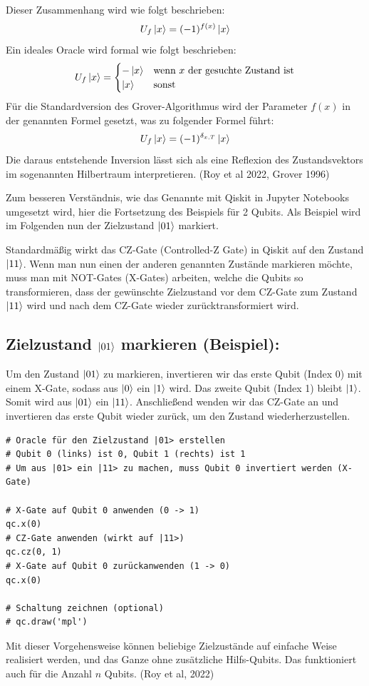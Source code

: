 Dieser Zusammenhang wird wie folgt beschrieben:
$$
U_f \ket{x} = (-1)^{f(x)} \ket{x}
$$
Ein ideales Oracle wird formal wie folgt beschrieben:
$$
U_f \ket{x} = \begin{cases} -\ket{x} & \text{wenn } x \text{ der gesuchte Zustand ist} \\ \ket{x} & \text{sonst} \end{cases}
$$
Für die Standardversion des Grover-Algorithmus wird der Parameter $f(x)$ in der genannten Formel gesetzt, was zu folgender Formel führt:
$$
U_f \ket{x} = (-1)^{\delta_{x,T}} \ket{x}
$$
Die daraus entstehende Inversion lässt sich als eine Reflexion des Zustandsvektors im sogenannten Hilbertraum interpretieren. (Roy et al 2022, Grover 1996)

Zum besseren Verständnis, wie das Genannte mit Qiskit in Jupyter Notebooks umgesetzt wird, hier die Fortsetzung des Beispiels für 2 Qubits. Als Beispiel wird im Folgenden nun der Zielzustand $\ket{01}$ markiert.

Standardmäßig wirkt das CZ-Gate (Controlled-Z Gate) in Qiskit auf den Zustand $\ket{11}$. Wenn man nun einen der anderen genannten Zustände markieren möchte, muss man mit NOT-Gates (X-Gates) arbeiten, welche die Qubits so transformieren, dass der gewünschte Zielzustand vor dem CZ-Gate zum Zustand $\ket{11}$ wird und nach dem CZ-Gate wieder zurücktransformiert wird.

\subsection*{Zielzustand $\ket{01}$ markieren (Beispiel):}
Um den Zustand $\ket{01}$ zu markieren, invertieren wir das erste Qubit (Index 0) mit einem X-Gate, sodass aus $\ket{0}$ ein $\ket{1}$ wird. Das zweite Qubit (Index 1) bleibt $\ket{1}$. Somit wird aus $\ket{01}$ ein $\ket{11}$. Anschließend wenden wir das CZ-Gate an und invertieren das erste Qubit wieder zurück, um den Zustand wiederherzustellen.

\begin{verbatim}
# Oracle für den Zielzustand |01> erstellen
# Qubit 0 (links) ist 0, Qubit 1 (rechts) ist 1
# Um aus |01> ein |11> zu machen, muss Qubit 0 invertiert werden (X-Gate)

# X-Gate auf Qubit 0 anwenden (0 -> 1)
qc.x(0)
# CZ-Gate anwenden (wirkt auf |11>)
qc.cz(0, 1)
# X-Gate auf Qubit 0 zurückanwenden (1 -> 0)
qc.x(0)

# Schaltung zeichnen (optional)
# qc.draw('mpl')
\end{verbatim}
Mit dieser Vorgehensweise können beliebige Zielzustände auf einfache Weise realisiert werden, und das Ganze ohne zusätzliche Hilfs-Qubits. Das funktioniert auch für die Anzahl $n$ Qubits. (Roy et al, 2022)

